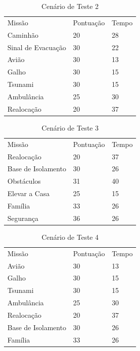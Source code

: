 \begin{table}[!h]
\centering
\caption{Cenário de Teste 2}
\label{cenario2}
\begin{tabular}{lll}
Missão             & Pontuação & Tempo \\
Caminhão           & 20        & 28    \\
Sinal de Evacuação & 30        & 22    \\
Avião              & 30        & 13    \\
Galho              & 30        & 15    \\
Tsunami            & 30        & 15    \\
Ambulância         & 25        & 30    \\
Realocação         & 20        & 37 
\end{tabular}
\end{table}	

\begin{table}[!h]
\centering
\caption{Cenário de Teste 3}
\label{cenario3}
\begin{tabular}{lll}
Missão             & Pontuação & Tempo \\
Realocação         & 20        & 37    \\
Base de Isolamento & 30        & 26    \\
Obstáculos         & 31        & 40    \\
Elevar a Casa      & 25        & 15    \\
Família            & 33        & 26    \\
Segurança          & 36        & 26   
\end{tabular}
\end{table}

\begin{table}[!h]
\centering
\caption{Cenário de Teste 4}
\label{cenario4}
\begin{tabular}{lll}
Missão             & Pontuação & Tempo \\
Avião              & 30        & 13    \\
Galho              & 30        & 15    \\
Tsunami            & 30        & 15    \\
Ambulância         & 25        & 30    \\
Realocação         & 20        & 37    \\
Base de Isolamento & 30        & 26    \\
Família            & 33        & 26   
\end{tabular}
\end{table}

